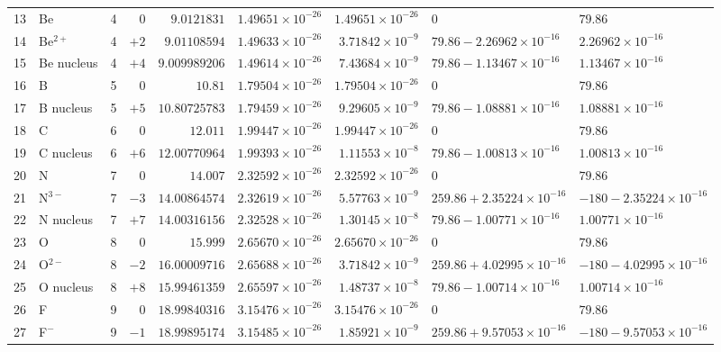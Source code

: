 {\begin{tabular}{@{}r l r r r r r l l@{}}
13 & Be & 4 & $0$ & $9.0121831$ & $1.49651{\times}10^{-26}$ & $1.49651{\times}10^{-26}$ & $0$ & $79.86$ \\
14 & Be$^{2+}$ & 4 & $+2$ & $9.01108594$ & $1.49633{\times}10^{-26}$ & $3.71842{\times}10^{-9}$ & $79.86 - 2.26962{\times}10^{-16}$ & $2.26962{\times}10^{-16}$ \\
15 & Be nucleus & 4 & $+4$ & $9.009989206$ & $1.49614{\times}10^{-26}$ & $7.43684{\times}10^{-9}$ & $79.86 - 1.13467{\times}10^{-16}$ & $1.13467{\times}10^{-16}$ \\
16 & B & 5 & $0$ & $10.81$ & $1.79504{\times}10^{-26}$ & $1.79504{\times}10^{-26}$ & $0$ & $79.86$ \\
17 & B nucleus & 5 & $+5$ & $10.80725783$ & $1.79459{\times}10^{-26}$ & $9.29605{\times}10^{-9}$ & $79.86 - 1.08881{\times}10^{-16}$ & $1.08881{\times}10^{-16}$ \\
18 & C & 6 & $0$ & $12.011$ & $1.99447{\times}10^{-26}$ & $1.99447{\times}10^{-26}$ & $0$ & $79.86$ \\
19 & C nucleus & 6 & $+6$ & $12.00770964$ & $1.99393{\times}10^{-26}$ & $1.11553{\times}10^{-8}$ & $79.86 - 1.00813{\times}10^{-16}$ & $1.00813{\times}10^{-16}$ \\
20 & N & 7 & $0$ & $14.007$ & $2.32592{\times}10^{-26}$ & $2.32592{\times}10^{-26}$ & $0$ & $79.86$ \\
21 & N$^{3-}$ & 7 & $-3$ & $14.00864574$ & $2.32619{\times}10^{-26}$ & $5.57763{\times}10^{-9}$ & $259.86 + 2.35224{\times}10^{-16}$ & $-180 - 2.35224{\times}10^{-16}$ \\
22 & N nucleus & 7 & $+7$ & $14.00316156$ & $2.32528{\times}10^{-26}$ & $1.30145{\times}10^{-8}$ & $79.86 - 1.00771{\times}10^{-16}$ & $1.00771{\times}10^{-16}$ \\
23 & O & 8 & $0$ & $15.999$ & $2.65670{\times}10^{-26}$ & $2.65670{\times}10^{-26}$ & $0$ & $79.86$ \\
24 & O$^{2-}$ & 8 & $-2$ & $16.00009716$ & $2.65688{\times}10^{-26}$ & $3.71842{\times}10^{-9}$ & $259.86 + 4.02995{\times}10^{-16}$ & $-180 - 4.02995{\times}10^{-16}$ \\
25 & O nucleus & 8 & $+8$ & $15.99461359$ & $2.65597{\times}10^{-26}$ & $1.48737{\times}10^{-8}$ & $79.86 - 1.00714{\times}10^{-16}$ & $1.00714{\times}10^{-16}$ \\
26 & F & 9 & $0$ & $18.99840316$ & $3.15476{\times}10^{-26}$ & $3.15476{\times}10^{-26}$ & $0$ & $79.86$ \\
27 & F$^{-}$ & 9 & $-1$ & $18.99895174$ & $3.15485{\times}10^{-26}$ & $1.85921{\times}10^{-9}$ & $259.86 + 9.57053{\times}10^{-16}$ & $-180 - 9.57053{\times}10^{-16}$ \\

\end{tabular}}
